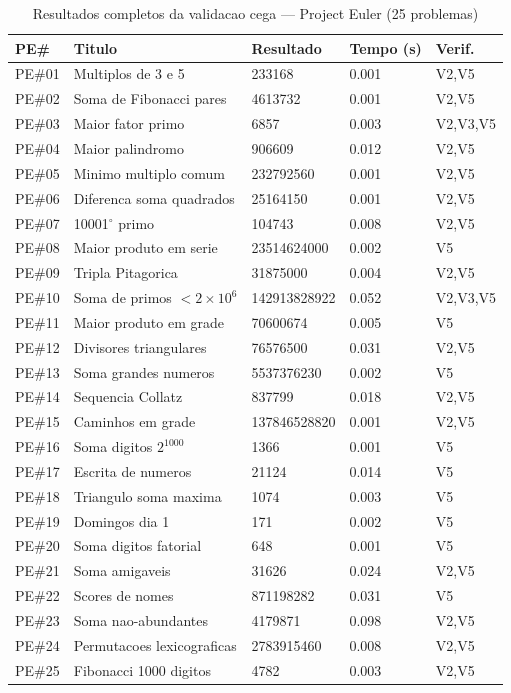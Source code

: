 \begin{table}[H]\centering\footnotesize
\caption{Resultados completos da validacao cega --- Project Euler (25 problemas)}
\label{tab:blind-pe}
\begin{tabular}{p{}p{}p{}p{}p{}}
\toprule
\textbf{PE\#} & \textbf{Titulo} & \textbf{Resultado} & \textbf{Tempo (s)} & \textbf{Verif.} \\
\midrule
PE\#01 & Multiplos de 3 e 5 & 233168 & 0.001 & V2,V5 \\
PE\#02 & Soma de Fibonacci pares & 4613732 & 0.001 & V2,V5 \\
PE\#03 & Maior fator primo & 6857 & 0.003 & V2,V3,V5 \\
PE\#04 & Maior palindromo & 906609 & 0.012 & V2,V5 \\
PE\#05 & Minimo multiplo comum & 232792560 & 0.001 & V2,V5 \\
PE\#06 & Diferenca soma quadrados & 25164150 & 0.001 & V2,V5 \\
PE\#07 & 10001$^{\circ}$ primo & 104743 & 0.008 & V2,V5 \\
PE\#08 & Maior produto em serie & 23514624000 & 0.002 & V5 \\
PE\#09 & Tripla Pitagorica & 31875000 & 0.004 & V2,V5 \\
PE\#10 & Soma de primos $<2\times10^6$ & 142913828922 & 0.052 & V2,V3,V5 \\
PE\#11 & Maior produto em grade & 70600674 & 0.005 & V5 \\
PE\#12 & Divisores triangulares & 76576500 & 0.031 & V2,V5 \\
PE\#13 & Soma grandes numeros & 5537376230 & 0.002 & V5 \\
PE\#14 & Sequencia Collatz & 837799 & 0.018 & V2,V5 \\
PE\#15 & Caminhos em grade & 137846528820 & 0.001 & V2,V5 \\
PE\#16 & Soma digitos $2^{1000}$ & 1366 & 0.001 & V5 \\
PE\#17 & Escrita de numeros & 21124 & 0.014 & V5 \\
PE\#18 & Triangulo soma maxima & 1074 & 0.003 & V5 \\
PE\#19 & Domingos dia 1 & 171 & 0.002 & V5 \\
PE\#20 & Soma digitos fatorial & 648 & 0.001 & V5 \\
PE\#21 & Soma amigaveis & 31626 & 0.024 & V2,V5 \\
PE\#22 & Scores de nomes & 871198282 & 0.031 & V5 \\
PE\#23 & Soma nao-abundantes & 4179871 & 0.098 & V2,V5 \\
PE\#24 & Permutacoes lexicograficas & 2783915460 & 0.008 & V2,V5 \\
PE\#25 & Fibonacci 1000 digitos & 4782 & 0.003 & V2,V5 \\
\bottomrule
\end{tabular}
\end{table}

